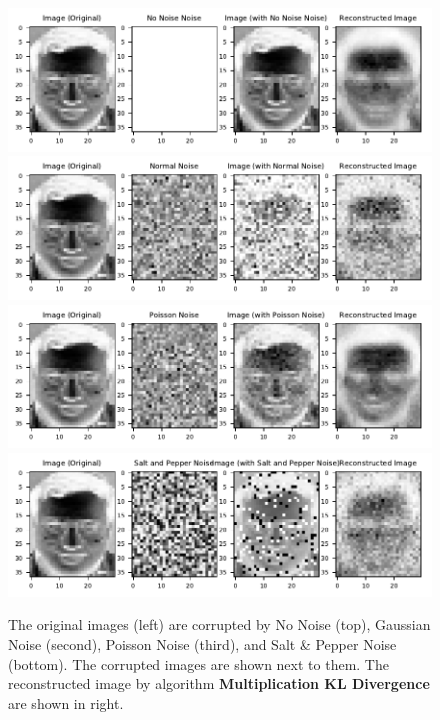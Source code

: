 \begin{figure}\label{noises}
	\centering
	\includegraphics[scale=.8]{Result_Multiplication_KL_Divergence_No_Noise_Comparison}\\
	\includegraphics[scale=.8]{Result_Multiplication_KL_Divergence_Normal_Comparison}\\
	\includegraphics[scale=.8]{Result_Multiplication_KL_Divergence_Poisson_Comparison}\\
	\includegraphics[scale=.8]{Result_Multiplication_KL_Divergence_Salt_and_Pepper_Comparison}\\
	\caption{The original images (left) are corrupted by No Noise (top), Gaussian Noise (second), Poisson Noise (third), and Salt \& Pepper Noise (bottom). The corrupted images are shown next to them. The reconstructed image by algorithm \textbf{Multiplication KL Divergence} are shown in right.}
	\label{fig:noise}
\end{figure}